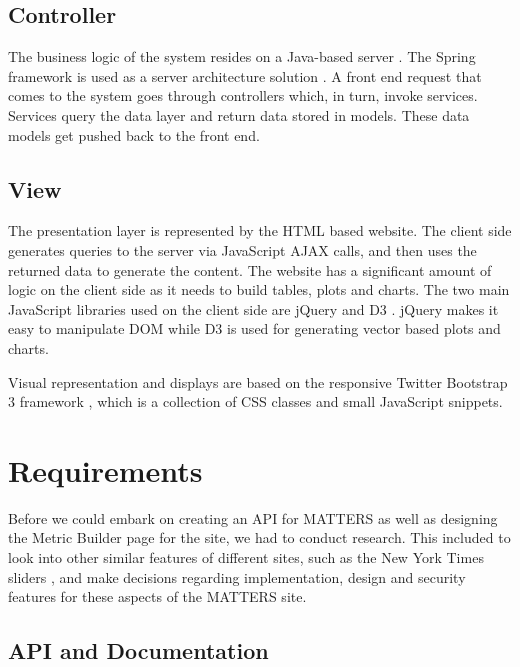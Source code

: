 		\subsection{Controller}
		
			The business logic of the system resides on a Java-based server \cite{java}. 
			The Spring framework is used as a server architecture solution \cite{spring}. A front 
			end request that comes to the system goes through controllers which, 
			in turn, invoke services. Services query the data layer and return 
			data stored	in models. These data models get pushed back to the 
			front end.
			
		\subsection{View}
			
			The presentation layer is represented by the HTML based website. The
			client side generates queries to the server via JavaScript AJAX 
			calls, and then uses the returned data to generate the content. The 
			website has a significant amount of logic on the client side as it 
			needs to build tables, plots and charts. The two main JavaScript 
			libraries used on the client side are jQuery \cite{jquery} and D3 \cite{d3}. jQuery makes it 
			easy to manipulate DOM while D3 is used for generating vector based 
			plots and charts.
			
			Visual representation and displays are based on the responsive 
			Twitter Bootstrap 3 framework \cite{bootstrap}, which is a collection of CSS classes 
			and small JavaScript snippets. 

	\section{Requirements}

		Before we could embark on creating an API for MATTERS as well as 
		designing the Metric Builder page for the site, we had to conduct 
		research. This included to look into other similar features of different 
		sites, such as the New York Times sliders \cite{slider}, and make decisions regarding implementation, design and security 
		features for these aspects of the MATTERS site.

	\subsection{API and Documentation}

